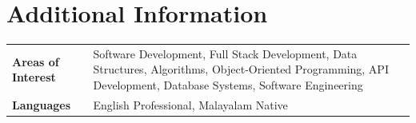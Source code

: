 \documentclass[10pt, a4paper]{article}
\begin{document}
\section*{Additional Information}

\begin{tabular}{@{} >{\bfseries}p{3.8cm} p{13cm} @{}}
Areas of Interest & Software Development, Full Stack Development, Data Structures, Algorithms, Object-Oriented Programming, API Development, Database Systems, Software Engineering \\
Languages         & English Professional, Malayalam Native \\
\end{tabular}
\end{document}
